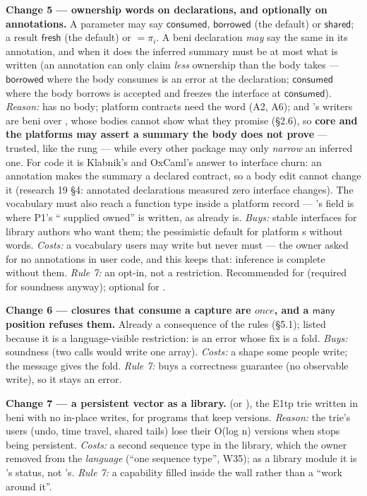 \textbf{Change 5 — ownership words on  declarations, and optionally on  annotations.} A  parameter may say $\mathsf{consumed}$, $\mathsf{borrowed}$ (the default) or $\mathsf{shared}$; a result $\mathsf{fresh}$ (the default) or $=\pi _{i}$. A  beni declaration \emph{may} say the same in its annotation, and when it does the inferred summary must be at most what is written (an annotation can only claim \emph{less} ownership than the body takes — $\mathsf{borrowed}$ where the body consumes is an error at the declaration; $\mathsf{consumed}$ where the body borrows is accepted and freezes the interface at $\mathsf{consumed}$). \emph{Reason:}  has no body; platform contracts need the word (A2, A6); and 's writers are beni over , whose bodies cannot show what they promise (§2.6), so \textbf{core and the platforms may assert a summary the body does not prove} — trusted, like the rung — while every other package may only \emph{narrow} an inferred one. For  code it is Klabnik's and OxCaml's answer to interface churn: an annotation makes the summary a declared contract, so a body edit cannot change it (research 19 §4: annotated declarations measured zero interface changes). The vocabulary must also reach a function type inside a platform record — 's  field is where P1's “ supplied owned” is written, as  already is. \emph{Buys:} stable interfaces for library authors who want them; the pessimistic default for platform s without words. \emph{Costs:} a vocabulary users may write but never must — the owner asked for no annotations in user code, and this keeps that: inference is complete without them. \emph{Rule 7:} an opt-in, not a restriction. Recommended for  (required for soundness anyway); optional for .

\textbf{Change 6 — closures that consume a capture are $\mathit{once}$, and a $\mathsf{many}$ position refuses them.} Already a consequence of the rules (§5.1); listed because it is a language-visible restriction:  is an error whose fix is a fold. \emph{Buys:} soundness (two calls would write one array). \emph{Costs:} a shape some people write; the message gives the fold. \emph{Rule 7:} buys a correctness guarantee (no observable write), so it stays an error.

\textbf{Change 7 — a persistent vector as a library.}  (or ), the E1tp trie written in beni with no in-place writes, for programs that keep versions. \emph{Reason:} the trie's users (undo, time travel, shared tails) lose their O(log n) versions when  stops being persistent. \emph{Costs:} a second sequence type in the library, which the owner removed from the \emph{language} (“one sequence type”, W35); as a library module it is 's status, not 's. \emph{Rule 7:} a capability filled inside the wall rather than a “work around it”.

